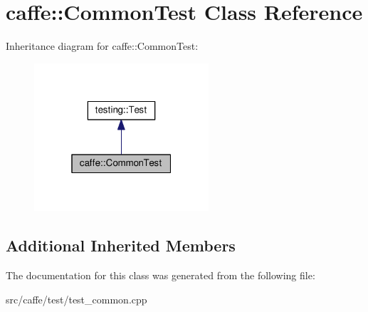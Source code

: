 \hypertarget{classcaffe_1_1_common_test}{}\section{caffe\+:\+:Common\+Test Class Reference}
\label{classcaffe_1_1_common_test}


Inheritance diagram for caffe\+:\+:Common\+Test\+:
\nopagebreak
\begin{figure}[H]
\begin{center}
\leavevmode
\includegraphics[width=184pt]{classcaffe_1_1_common_test__inherit__graph}
\end{center}
\end{figure}
\subsection*{Additional Inherited Members}


The documentation for this class was generated from the following file\+:\begin{DoxyCompactItemize}
\item 
src/caffe/test/test\+\_\+common.\+cpp\end{DoxyCompactItemize}
